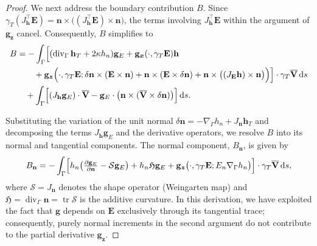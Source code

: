\documentclass[12pt,reqno]{amsart}
\theoremstyle{definition}
\numberwithin{equation}{section}
\begin{document}
\begin{proof}
We next  address the boundary contribution $B$. Since $\gamma_T(J_{\mathbf{h}}^{\top}\mathbf{E}) = \mathbf{n} \times \bigl( (J_{\mathbf{h}}^{\top}\mathbf{E}) \times \mathbf{n} \bigr)$, the terms involving $J_{\mathbf{h}}^{\top}\mathbf{E}$ within the argument of $\mathbf{g}_{\boldsymbol{z}}$ cancel. Consequently, $B$ simplifies to
\begin{equation*}
\begin{aligned}
B &= -\int_\Gamma \Bigl[ (\operatorname{div}_\Gamma\mathbf{h}_T + 2\kappa h_n) \mathbf{g}_E + \mathbf{g}_{\boldsymbol{x}}(\cdot,\gamma_T\mathbf{E})\mathbf{h} \\
&\qquad + \mathbf{g}_{\boldsymbol{z}} \Bigl( \cdot, \gamma_T\mathbf{E}; \delta\mathbf{n}\times(\mathbf{E}\times\mathbf{n}) + \mathbf{n}\times(\mathbf{E}\times\delta\mathbf{n}) + \mathbf{n}\times\bigl((J_{\mathbf{E}}\mathbf{h})\times\mathbf{n}\bigr) \Bigr) \Bigr] \cdot \gamma_T\overline{\mathbf{V}} \, \mathrm{d}s \\
&\quad +\int_\Gamma \Bigl[ (J_{\mathbf{h}}\mathbf{g}_E) \cdot \overline{\mathbf{V}} - \mathbf{g}_E \cdot \bigl( \mathbf{n} \times (\overline{\mathbf{V}} \times \delta\mathbf{n}) \bigr) \Bigr] \, \mathrm{d}s.
\end{aligned}
\end{equation*}




Substituting the variation of the unit normal $\delta\mathbf{n} = -\nabla_\Gamma h_n + J_{\mathbf{n}}\mathbf{h}_T$ and decomposing the terms $J_{\mathbf{h}}\mathbf{g}_E$ and the derivative operators, we resolve $B$ into its normal and tangential components. The normal component, $B_{\mathbf{n}}$, is given by
\begin{equation*}
B_{\mathbf{n}} = -\int_\Gamma \Bigl[ h_n \bigl( \tfrac{\partial \mathbf{g}_E}{\partial\mathbf{n}} - \mathcal{S}\mathbf{g}_E \bigr) + h_n \mathfrak{H} \mathbf{g}_E + \mathbf{g}_{\boldsymbol{z}} \bigl( \cdot, \gamma_T\mathbf{E}; E_n \nabla_\Gamma h_n \bigr) \Bigr] \cdot \gamma_T\overline{\mathbf{V}} \, \mathrm{d}s,
\end{equation*}
where $\mathcal{S} = J_{\mathbf{n}}$ denotes the shape operator (Weingarten map) and $\mathfrak{H} = \operatorname{div}_\Gamma \mathbf{n} = \operatorname{tr}\mathcal{S}$ is the additive curvature. In this derivation, we have exploited the fact that $\mathbf{g}$ depends on $\mathbf{E}$ exclusively through its tangential trace; consequently, purely normal increments in the second argument do not contribute to the partial derivative $\mathbf{g}_{\boldsymbol{z}}$.


\end{proof}
\end{document}
